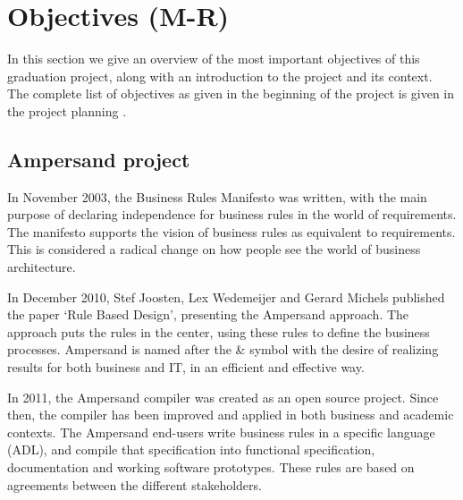 
\section{Objectives (M-R)}
\label{sec:objectives}
In this section we give an overview of the most important objectives of this graduation project, along with an introduction to the project and its context.
The complete list of objectives as given in the beginning of the project is given in the project planning .

\subsection{Ampersand project}
In November 2003, the Business Rules Manifesto  was written, with the main purpose of declaring independence for business rules in the world of requirements.
The manifesto supports the vision of business rules as equivalent to requirements.
This is considered a radical change on how people see the world of business architecture.

In December 2010, Stef Joosten, Lex Wedemeijer and Gerard Michels published the paper `Rule Based Design', presenting the Ampersand approach.
The approach puts the rules in the center, using these rules to define the business processes.
Ampersand is named after the \& symbol with the desire of realizing results for both business and IT, in an efficient and effective way.

In 2011, the Ampersand compiler was created as an open source project.
Since then, the compiler has been improved and applied in both business and academic contexts.
The Ampersand end-users write business rules in a specific language (ADL), and compile that specification into functional specification, documentation and working software prototypes.
%
These rules are based on agreements between the different stakeholders.

